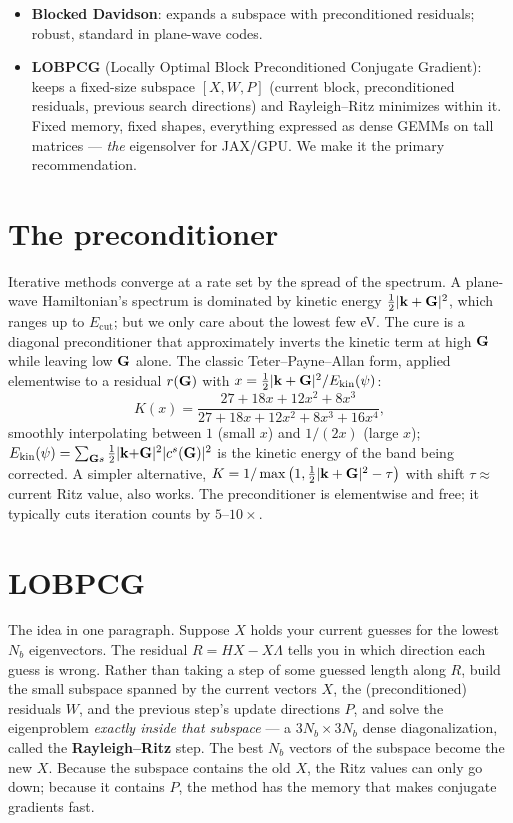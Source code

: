 \begin{itemize}[leftmargin=2em]
\item \textbf{Blocked Davidson}: expands a subspace with preconditioned
residuals; robust, standard in plane-wave codes.
\item \textbf{LOBPCG} (Locally Optimal Block Preconditioned Conjugate
Gradient): keeps a fixed-size subspace $[X, W, P]$ (current block,
preconditioned residuals, previous search directions) and Rayleigh--Ritz
minimizes within it. Fixed memory, fixed shapes, everything expressed as
dense GEMMs on tall matrices --- \emph{the} eigensolver for JAX/GPU. We make
it the primary recommendation.
\end{itemize}

\section{The preconditioner}

Iterative methods converge at a rate set by the spread of the spectrum. A
plane-wave Hamiltonian's spectrum is dominated by kinetic energy
$\tfrac12|\mathbf{k}+\mathbf{G}|^2$, which ranges up to $E_{\mathrm{cut}}$; but we only
care about the lowest few eV. The cure is a diagonal preconditioner that
approximately inverts the kinetic term at high $\mathbf{G}$ while leaving low $\mathbf{G}$
alone. The classic Teter--Payne--Allan form, applied elementwise to a
residual $r(\mathbf{G})$ with $x = \tfrac12|\mathbf{k}+\mathbf{G}|^2 / E_{\mathrm{kin}}(\psi)$:
\begin{equation}
K(x) = \frac{27 + 18x + 12x^2 + 8x^3}
{27 + 18x + 12x^2 + 8x^3 + 16 x^4},
\label{eq:teter}
\end{equation}
smoothly interpolating between $1$ (small $x$) and $1/(2x)$ (large $x$);
$E_{\mathrm{kin}}(\psi) = \sum_{\mathbf{G} s}\tfrac12|\mathbf{k}{+}\mathbf{G}|^2 |c^s(\mathbf{G})|^2$ is
the kinetic energy of the band being corrected.
A simpler alternative, $K = 1/\max\big(1, \tfrac12|\mathbf{k}+\mathbf{G}|^2 - \tau\big)$
with shift $\tau \approx$ current Ritz value, also works. The preconditioner
is elementwise and free; it typically cuts iteration counts by
$5$--$10\times$.

\section{LOBPCG}

The idea in one paragraph. Suppose $X$ holds your current guesses for the
lowest $N_b$ eigenvectors. The residual $R = HX - X\Lambda$ tells you in
which direction each guess is wrong. Rather than taking a step of some
guessed length along $R$, build the small subspace spanned by the current
vectors $X$, the (preconditioned) residuals $W$, and the previous step's
update directions $P$, and solve the eigenproblem \emph{exactly inside that
subspace} --- a $3N_b\times3N_b$ dense diagonalization, called the
\textbf{Rayleigh--Ritz} step. The best $N_b$ vectors of the subspace
become the new $X$. Because the subspace contains the old $X$, the Ritz
values can only go down; because it contains $P$, the method has the
memory that makes conjugate gradients fast.


